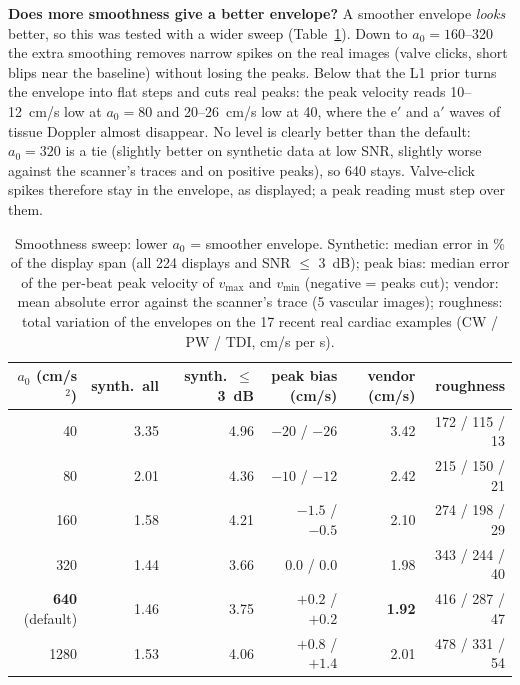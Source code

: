 \documentclass[11pt,a4paper]{article}
\newcommand{\vmax}{v_{\max}}
\newcommand{\vmin}{v_{\min}}
\begin{document}
\textbf{Does more smoothness give a better envelope?} A smoother envelope \emph{looks} better, so this was tested
with a wider sweep (Table~\ref{tab:smooth}). Down to $a_0 = 160$--320 the extra smoothing removes narrow spikes on the
real images (valve clicks, short blips near the baseline) without losing the peaks. Below that the L1 prior turns
the envelope into flat steps and cuts real peaks: the peak velocity reads 10--12~cm/s low at $a_0 = 80$ and 20--26~cm/s
low at 40, where the e$'$ and a$'$ waves of tissue Doppler almost disappear. No level is clearly better than the
default: $a_0 = 320$ is a tie (slightly better on synthetic data at low SNR, slightly worse against the scanner's
traces and on positive peaks), so 640 stays. Valve-click spikes therefore stay in the envelope, as displayed; a peak
reading must step over them.

\begin{table}[!htbp]
\centering\small
\caption{Smoothness sweep: lower $a_0$ = smoother envelope. Synthetic: median error in \% of the display span (all
224 displays and SNR $\le$ 3~dB); peak bias: median error of the per-beat peak velocity of $\vmax$ and $\vmin$
(negative = peaks cut); vendor: mean absolute error against the scanner's trace (5 vascular images); roughness: total
variation of the envelopes on the 17 recent real cardiac examples (CW / PW / TDI, cm/s per s).}
\label{tab:smooth}
\setlength{\tabcolsep}{4pt}
\begin{tabular}{@{}rrrrrr@{}}
\toprule
$a_0$ (cm/s$^2$) & synth.\ all & synth.\ $\le$3~dB & peak bias (cm/s) & vendor (cm/s) & roughness \\ \midrule
40 & 3.35 & 4.96 & $-20$ / $-26$ & 3.42 & 172 / 115 / 13 \\
80 & 2.01 & 4.36 & $-10$ / $-12$ & 2.42 & 215 / 150 / 21 \\
160 & 1.58 & 4.21 & $-1.5$ / $-0.5$ & 2.10 & 274 / 198 / 29 \\
320 & 1.44 & 3.66 & 0.0 / 0.0 & 1.98 & 343 / 244 / 40 \\
\textbf{640} (default) & 1.46 & 3.75 & $+0.2$ / $+0.2$ & \textbf{1.92} & 416 / 287 / 47 \\
1280 & 1.53 & 4.06 & $+0.8$ / $+1.4$ & 2.01 & 478 / 331 / 54 \\
\bottomrule
\end{tabular}
\end{table}
\end{document}
